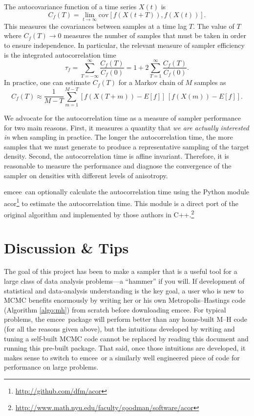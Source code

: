 \documentclass[12pt,preprint]{aastex}
\newcommand{\project}[1]{{\sffamily #1}}
\newcommand{\thisplain}{emcee}
\newcommand{\this}{\project{\thisplain}}
\newcommand{\algo}[1]{Algorithm \ref{algo:#1}}
\renewcommand{\vector}[1]{#1}
\begin{document}
The autocovariance function of a time series $\vector{X} (t)$ is
\begin{equation}
    C_f (T) = \lim_{t \to \infty} \mathrm{cov}
        \left [ f\left (\vector{X}(t+T) \right ),
            f\left (\vector{X}(t) \right ) \right ].
\end{equation}
This measures the covariances between samples at a time lag $T$. The
value of $T$ where $C_f(T) \to 0$ measures the number of samples that
must be taken in order to ensure independence. In particular, the
relevant measure of sampler efficiency is the integrated autocorrelation
time
\begin{equation}
    \tau_f = \sum_{T=-\infty} ^{\infty} \frac{C_f(T)}{C_f(0)}
        = 1+2\sum_{T=1} ^{\infty} \frac{C_f(T)}{C_f(0)}.
\end{equation}
In practice, one can estimate $C_f (T)$ for a Markov chain of $M$ samples as
\begin{equation}
    C_f (T) \approx \frac{1}{M-T} \sum_{m=1}^{M-T}
        \left [ f(X(T+m)) - E[f] \right ] \,
        \left [ f(X(m)) - E[f] \right ].
\end{equation}

We advocate for the autocorrelation time as a measure of sampler
performance for two main reasons. First, it measures a quantity
that \emph{we are actually interested in} when sampling in practice.
The longer the autocorrelation time, the more samples that we must
generate to produce a representative sampling of the target
density. Second, the autocorrelation time is affine invariant. Therefore,
it is reasonable to measure the performance and diagnose the convergence
of the sampler on densities with different levels of anisotropy.

\this\ can optionally calculate the autocorrelation time using the Python
module \project{acor}\footnote{\url{http://github.com/dfm/acor}} to estimate
the autocorrelation time. This module is a direct port of the original
algorithm  and implemented by those
authors in
C++.\footnote{\url{http://www.math.nyu.edu/faculty/goodman/software/acor}}

\section{Discussion \& Tips}

The goal of this project has been to make a sampler that is a useful
tool for a large class of data analysis problems---a ``hammer'' if you
will.  If development of statistical and data-analysis understanding
is the key goal, a user who is new to MCMC benefits enormously by
writing her or his own Metropolis--Hastings code (\algo{mh}) from
scratch before downloading \this.  For typical problems, the
\this\ package will perform better than any home-built M--H code (for
all the reasons given above), but the intuitions developed by writing
and tuning a self-built MCMC code cannot be replaced by reading this
document and running this pre-built package.  That said, once those
intuitions are developed, it makes sense to switch to \this\ or a
similarly well engineered piece of code for performance on large
problems.
\end{document}

